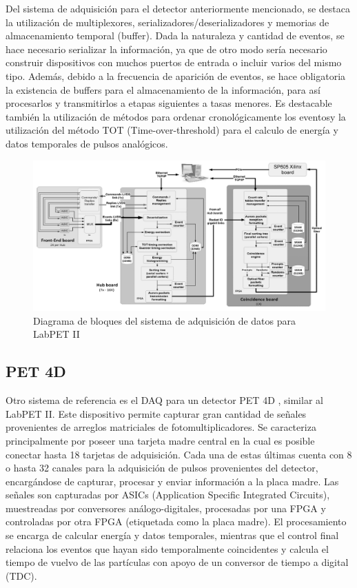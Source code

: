 \par Del sistema de adquisición para el detector anteriormente mencionado, se destaca la utilización de multiplexores, serializadores/deserializadores y memorias de almacenamiento temporal (buffer). Dada la naturaleza y cantidad de eventos, se hace necesario serializar la información, ya que de otro modo sería necesario construir dispositivos con muchos puertos de entrada o incluir varios del mismo tipo. Además, debido a la frecuencia de aparición de eventos, se hace obligatoria la existencia de buffers para el almacenamiento de la información, para así procesarlos y transmitirlos a etapas siguientes a tasas menores. Es destacable también la utilización de métodos para ordenar cronológicamente los eventosy la utilización del método TOT (Time-over-threshold) para el calculo de energía y datos temporales de pulsos analógicos. 


\begin{figure}[H]
	\centering
	\includegraphics[scale=0.55]{img/njejimana.png}
	\caption{Diagrama de bloques del sistema de adquisición de datos para LabPET II \cite{Njejimana2013DesignImaging}}
	\label{fig:njejimana}
\end{figure}

\newpage
\subsection{PET 4D}

\par Otro sistema de referencia es el DAQ para un detector PET 4D \cite{Marcatili2011DevelopmentDetector}, similar al LabPET II. Este dispositivo permite capturar gran cantidad de señales provenientes de arreglos matriciales de fotomultiplicadores. Se caracteriza principalmente por poseer una tarjeta madre central en la cual es posible conectar hasta 18 tarjetas de adquisición. Cada una de estas últimas cuenta con 8 o hasta 32 canales para la adquisición de pulsos provenientes del detector, encargándose de capturar, procesar y enviar información a la placa madre.
Las señales son capturadas por ASICs (Application Specific Integrated Circuits), muestreadas por conversores análogo-digitales, procesadas por una FPGA y controladas por otra FPGA (etiquetada como la placa madre). El procesamiento se encarga de calcular energía y datos temporales, mientras que el control final relaciona los eventos que hayan sido temporalmente coincidentes y calcula el tiempo de vuelvo de las partículas con apoyo de un conversor de tiempo a digital (TDC).


